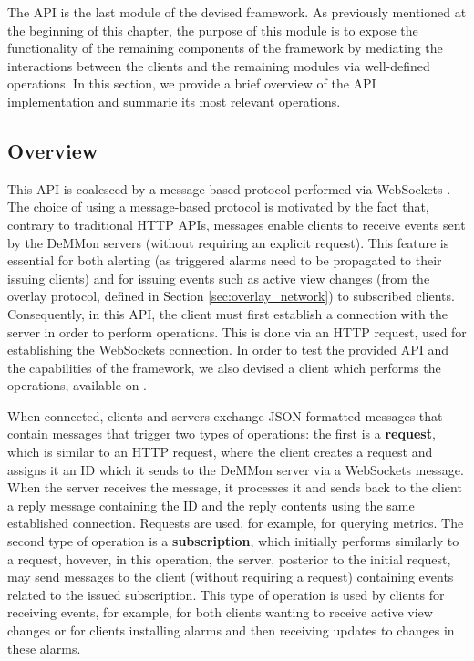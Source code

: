 
The API is the last module of the devised framework. As previously mentioned at the beginning of this chapter, the purpose of this module is to expose the functionality of the remaining components of the framework by mediating the interactions between the clients and the remaining modules via well-defined operations. In this section, we provide a brief overview of the API implementation and summarie its most relevant operations. 

\subsection{Overview}

This API is coalesced by a message-based protocol performed via WebSockets \cite{websocketsRFC}. The choice of using a message-based protocol is motivated by the fact that, contrary to traditional HTTP APIs, messages enable clients to receive events sent by the DeMMon servers (without requiring an explicit request). This feature is essential for both alerting (as triggered alarms need to be propagated to their issuing clients) and for issuing events such as active view changes (from the overlay protocol, defined in Section \ref{sec:overlay_network}) to subscribed clients. Consequently, in this API, the client must first establish a connection with the server in order to perform operations. This is done via an HTTP request, used for establishing the WebSockets connection. In order to test the provided API and the capabilities of the framework, we also devised a client which performs the operations, available on \cite{demmon-client-repo}.

When connected, clients and servers exchange JSON formatted messages that contain messages that trigger two types of operations: the first is a \textbf{request}, which is similar to an HTTP request, where the client creates a request and assigns it an ID which it sends to the DeMMon server via a WebSockets message. When the server receives the message, it processes it and sends back to the client a reply message containing the ID and the reply contents using the same established connection. Requests are used, for example, for querying metrics. The second type of operation is a \textbf{subscription}, which initially performs similarly to a request, hovever, in this operation, the server, posterior to the initial request, may send messages to the client (without requiring a request) containing events related to the issued subscription. This type of operation is used by clients for receiving events, for example, for both clients wanting to receive active view changes or for clients installing alarms and then receiving updates to changes in these alarms.


